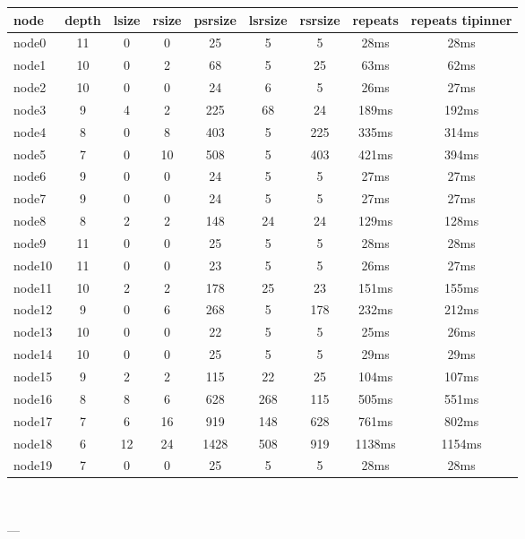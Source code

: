 

\begin{tabular}{|l|c|c|c|c|c|c|c|c|}
\hline node & depth & lsize & rsize & psrsize & lsrsize & rsrsize   & repeats & repeats tipinner\\
    \hline node0 & 11 & 0 & 0 & 25 & 5 & 5 & 28ms & 28ms\\
    \hline node1 & 10 & 0 & 2 & 68 & 5 & 25 & 63ms & 62ms\\
    \hline node2 & 10 & 0 & 0 & 24 & 6 & 5 & 26ms & 27ms\\
    \hline node3 & 9 & 4 & 2 & 225 & 68 & 24 & 189ms & 192ms\\
    \hline node4 & 8 & 0 & 8 & 403 & 5 & 225 & 335ms & 314ms\\
    \hline node5 & 7 & 0 & 10 & 508 & 5 & 403 & 421ms & 394ms\\
    \hline node6 & 9 & 0 & 0 & 24 & 5 & 5 & 27ms & 27ms\\
    \hline node7 & 9 & 0 & 0 & 24 & 5 & 5 & 27ms & 27ms\\
    \hline node8 & 8 & 2 & 2 & 148 & 24 & 24 & 129ms & 128ms\\
    \hline node9 & 11 & 0 & 0 & 25 & 5 & 5 & 28ms & 28ms\\
    \hline node10 & 11 & 0 & 0 & 23 & 5 & 5 & 26ms & 27ms\\
    \hline node11 & 10 & 2 & 2 & 178 & 25 & 23 & 151ms & 155ms\\
    \hline node12 & 9 & 0 & 6 & 268 & 5 & 178 & 232ms & 212ms\\
    \hline node13 & 10 & 0 & 0 & 22 & 5 & 5 & 25ms & 26ms\\
    \hline node14 & 10 & 0 & 0 & 25 & 5 & 5 & 29ms & 29ms\\
    \hline node15 & 9 & 2 & 2 & 115 & 22 & 25 & 104ms & 107ms\\
    \hline node16 & 8 & 8 & 6 & 628 & 268 & 115 & 505ms & 551ms\\
    \hline node17 & 7 & 6 & 16 & 919 & 148 & 628 & 761ms & 802ms\\
    \hline node18 & 6 & 12 & 24 & 1428 & 508 & 919 & 1138ms & 1154ms\\
    \hline node19 & 7 & 0 & 0 & 25 & 5 & 5 & 28ms & 28ms\\

\hline
\end{tabular} \

---


